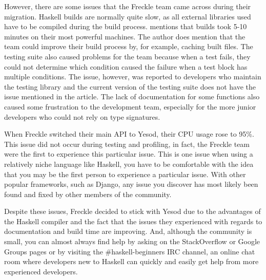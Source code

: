 However, there are some issues that the Freckle team came across during their migration.
Haskell builds are normally quite slow, as all external libraries used have to be
compiled during the build process. \citeauthor{frontrow} mentions that builds took
5-10 minutes on their most powerful machines. The author does mention that the team
could improve their build process by, for example, caching built files. The testing
suite also caused problems for the team because when a test fails, they could not determine
which condition caused the failure when a test block has multiple conditions. The issue,
however, was reported to developers who maintain the testing library and the current
version of the testing suite does not have the issue mentioned in the article. The
lack of documentation for some functions also caused some frustration to the development
team, especially for the more junior developers who could not rely on type signatures. \parencite{frontrow}

When Freckle switched their main API to Yesod, their CPU usage rose to 95\%. This issue
did not occur during testing and profiling, in fact, the Freckle team were the first to
experience this particular issue. This is one issue when using a relatively niche language
like Haskell, you have to be comfortable with the idea that you may be the first person
to experience a particular issue. With other popular frameworks, such as Django, any issue
you discover has most likely been found and fixed by other members of the community.

Despite these issues, Freckle decided to stick with Yesod due to the advantages of the
Haskell compiler and the fact that the issues they experienced with regards to documentation
and build time are improving. And, although the community is small, you can almost
always find help by asking on the StackOverflow or Google Groups pages or by visiting
the \#haskell-beginners IRC channel, an online chat room where developers new to Haskell
can quickly and easily get help from more experienced developers.
